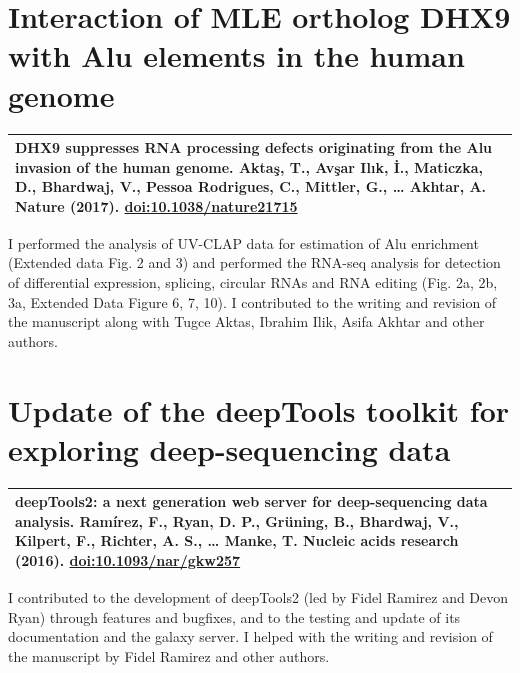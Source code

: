 \documentclass[11pt,twoside]{MPIthesis}
\theoremstyle{definition}
\theoremstyle{definition}
\theoremstyle{definition}
\theoremstyle{remark}
\begin{document}


\section{Interaction of MLE ortholog DHX9 with Alu elements in the human
genome}\label{interaction-of-mle-ortholog-dhx9-with-alu-elements-in-the-human-genome}
\begin{longtable}[]{@{}l@{}}
\toprule
\begin{minipage}[t]{0.97\columnwidth}\raggedright\strut
\textbf{DHX9 suppresses RNA processing defects originating from the Alu
invasion of the human genome.} Aktaş, T., Avşar Ilık, İ., Maticzka, D.,
\textbf{Bhardwaj, V.}, Pessoa Rodrigues, C., Mittler, G., \ldots{}
Akhtar, A. \textbf{Nature (2017)}. \url{doi:10.1038/nature21715}\strut
\end{minipage}\tabularnewline
\bottomrule
\end{longtable}
I performed the analysis of UV-CLAP data for estimation of Alu
enrichment (Extended data Fig. 2 and 3) and performed the RNA-seq
analysis for detection of differential expression, splicing, circular
RNAs and RNA editing (Fig. 2a, 2b, 3a, Extended Data Figure 6, 7, 10). I
contributed to the writing and revision of the manuscript along with
Tugce Aktas, Ibrahim Ilik, Asifa Akhtar and other authors.



\section{Update of the deepTools toolkit for exploring deep-sequencing
data}\label{update-of-the-deeptools-toolkit-for-exploring-deep-sequencing-data}
\begin{longtable}[]{@{}l@{}}
\toprule
\begin{minipage}[t]{0.97\columnwidth}\raggedright\strut
\textbf{deepTools2: a next generation web server for deep-sequencing
data analysis.} Ramírez, F., Ryan, D. P., Grüning, B., \textbf{Bhardwaj,
V.}, Kilpert, F., Richter, A. S., \ldots{} Manke, T. \textbf{Nucleic
acids research (2016)}. \url{doi:10.1093/nar/gkw257}\strut
\end{minipage}\tabularnewline
\bottomrule
\end{longtable}
I contributed to the development of deepTools2 (led by Fidel Ramirez and
Devon Ryan) through features and bugfixes, and to the testing and update
of its documentation and the galaxy server. I helped with the writing
and revision of the manuscript by Fidel Ramirez and other authors.
\end{document}
